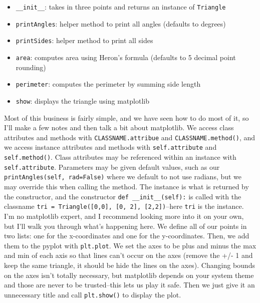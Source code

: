 \documentclass[12pt]{article}
\begin{document}
\begin{itemize} \item \texttt{\_\_init\_\_}: takes in three points and returns an instance of \texttt{Triangle}\end{itemize}
\begin{itemize} \item \texttt{printAngles}: helper method to print all angles (defaults to degrees)\end{itemize}
\begin{itemize} \item \texttt{printSides}: helper method to print all sides\end{itemize}
\begin{itemize} \item \texttt{area}: computes area using Heron's formula (defaults to 5 decimal point rounding)\end{itemize}
\begin{itemize} \item \texttt{perimeter}: computes the perimeter by summing side length\end{itemize}
\begin{itemize} \item \texttt{show}: displays the triangle using matplotlib\end{itemize}
Most of this business is fairly simple, and we have seen how to do most of it, so I'll make a few notes and then talk a bit about matplotlib. We access class attributes and methods with \texttt{CLASSNAME.attribue} and \texttt{CLASSNAME.method()}, and we access instance attributes and methods with \texttt{self.attribute} and \texttt{self.method()}. Class attributes may be referenced within an instance with \texttt{self.attribute}. Parameters may be given default values, such as our \texttt{printAngles(self, rad=False)} where we default to not use radians, but we may override this when calling the method. The instance is what is returned by the constructor, and the constructor \texttt{def \_\_init\_\_(self):} is called with the classname \texttt{tri = Triangle([0,0], [0, 2], [2,2])}--here \texttt{tri} is the instance.\\
I'm no matplotlib expert, and I recommend looking more into it on your own, but I'll walk you through what's happening here. We define all of our points in two lists: one for the x-coordinates and one for the y-coordinates. Then, we add them to the pyplot with \texttt{plt.plot}. We set the axes to be plus and minus the max and min of each axis so that lines can't occur on the axes (remove the +/- 1 and keep the same triangle, it should be hide the lines on the axes). Changing bounds on the axes isn't totally necessary, but matplotlib depends on your system theme and those are never to be trusted--this lets us play it safe. Then we just give it an unnecessary title and call \texttt{plt.show()} to display the plot.\\
\end{document}
